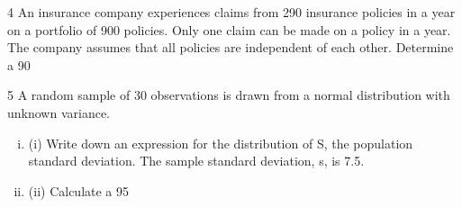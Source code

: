\documentclass[a4paper,12pt]{article}
\begin{document}
\begin{enumerate}


4 An insurance company experiences claims from 290 insurance policies in a year on a portfolio of 900 policies. Only one claim can be made on a policy in a year. The company assumes that all policies are independent of each other.
Determine a 90%

5 A random sample of 30 observations is drawn from a normal distribution with unknown variance.
\begin{enumerate}[(i)]
\item (i) Write down an expression for the distribution of S, the population standard deviation. 
The sample standard deviation, s, is 7.5.
\item (ii) Calculate a 95%
\end{enumerate}



\end{enumerate}
\end{document}
